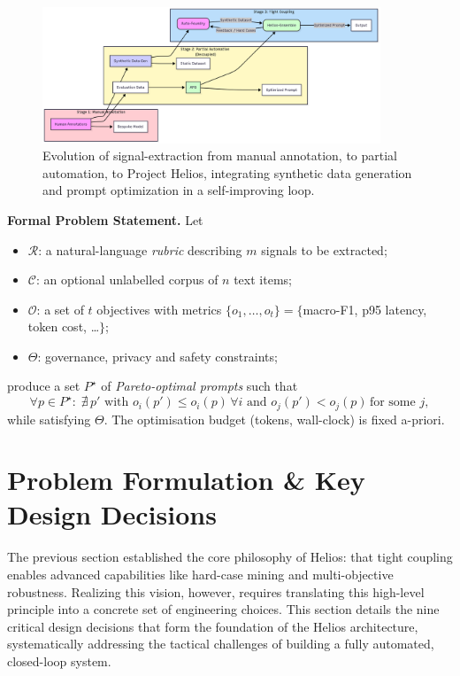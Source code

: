 \documentclass{article}
\begin{document}
\begin{figure}[H]
  \centering
  \includegraphics[width=0.9\textwidth]{evolution_timeline.png}
  \caption{Evolution of signal-extraction from manual annotation, to partial automation, to Project Helios, integrating synthetic data generation and prompt optimization in a self-improving loop.}
  \label{fig:evolution_timeline}
\end{figure}

\bigskip
\noindent\textbf{Formal Problem Statement.}
Let
\begin{itemize}[leftmargin=*,noitemsep]
  \item $\mathcal{R}$: a natural-language \emph{rubric} describing $m$ signals to be extracted;
  \item $\mathcal{C}$: an optional unlabelled corpus of $n$ text items;
  \item $\mathcal{O}$: a set of $t$ objectives with metrics  
        $\{o_1,\dots,o_t\} = \{$macro-F1, p95 latency, token cost, \ldots$\}$;
  \item $\Theta$: governance, privacy and safety constraints;
\end{itemize}
produce a set $P^{\star}$ of \emph{Pareto-optimal prompts} such that
\[
  \forall p \in P^{\star}\!:  \;
  \nexists\,p' \text{ with } 
  o_i(p') \le o_i(p)\,\forall i \text{ and } 
  o_j(p') < o_j(p)\,\text{for some } j,
\]
while satisfying $\Theta$. The optimisation budget (tokens, wall-clock) is fixed a-priori.

\section{Problem Formulation \& Key Design Decisions}
\label{sec:problem}
The previous section established the core philosophy of Helios: that tight coupling enables advanced capabilities like hard-case mining and multi-objective robustness. Realizing this vision, however, requires translating this high-level principle into a concrete set of engineering choices. This section details the nine critical design decisions that form the foundation of the Helios architecture, systematically addressing the tactical challenges of building a fully automated, closed-loop system.
\end{document}
